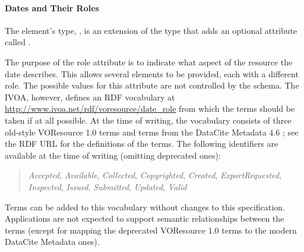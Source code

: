 \documentclass[11pt,a4paper]{ivoa}
\begin{document}
\paragraph{Dates and Their Roles}

The  element's type, , is an extension of the
 type that adds an
optional attribute called .

The purpose of the role attribute is to indicate what aspect of the
resource the date describes. This allows several  elements to be
provided, each with a different role. The possible values for this
attribute are not controlled by the schema.  The IVOA, however, defines
an RDF vocabulary at
\url{http://www.ivoa.net/rdf/voresource/date_role} from
which the  terms should be taken if at all possible.  At the
time of writing, the vocabulary consists of three old-style VOResource
1.0 terms and terms from the DataCite Metadata 4.6 \citep{std:DataCite46};
see the RDF URL for
the definitions of the terms.  The following identifiers are available at
the time of writing (omitting deprecated ones):

\begin{quotation}\noindent
\textsl{Accepted},
\textsl{Available},
\textsl{Collected},
\textsl{Copyrighted},
\textsl{Created},
\textsl{ExportRequested},
\textsl{Inspected},
\textsl{Issued},
\textsl{Submitted},
\textsl{Updated},
\textsl{Valid}
\end{quotation}


Terms can be added to this vocabulary without changes to this
specification.  Applications are not expected to support semantic
relationships between the terms (except for mapping the deprecated
VOResource 1.0 terms to the modern DataCite Metadata ones).
\end{document}
